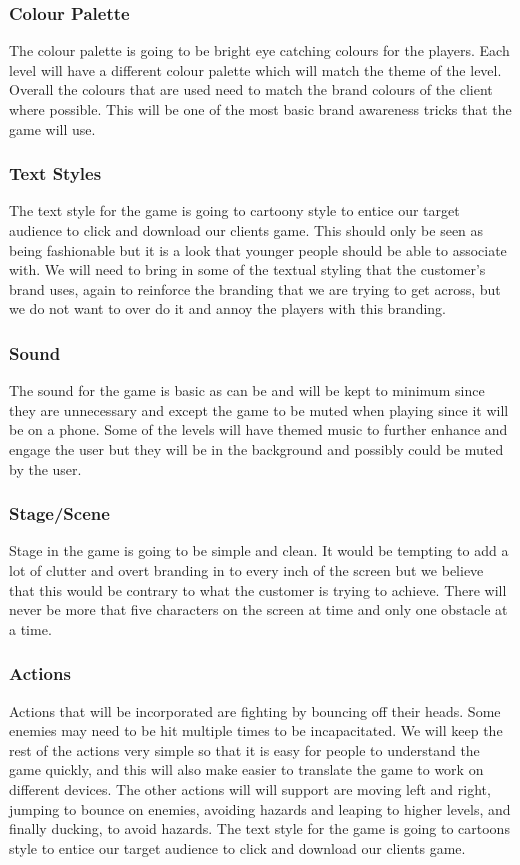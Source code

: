 \documentclass{article}
\begin{document}
\subsubsection{Colour Palette}
The colour palette is going to be bright eye catching colours for the players. Each level will have a different colour palette which will match the theme of the level.
Overall the colours that are used need to match the brand colours of the client where possible. This will be one of the most basic brand awareness tricks that the game will use.

\subsubsection{Text Styles}
The text style for the game is going to cartoony style to entice our target audience to click and download our clients game. This should only be seen as being fashionable but it is a look that younger people should be able to associate with. We will need to bring in some of the textual styling that the customer's brand uses, again to reinforce the branding that we are trying to get across, but we do not want to over do it and annoy the players with this branding.

\subsubsection{Sound}
The sound for the game is basic as can be and will be kept to minimum since they are unnecessary and except the game to be muted when playing since it will be on a phone. Some of the levels will have themed music to further enhance and engage the user but they will be in the background and possibly could be muted by the user.

\subsubsection{Stage/Scene}
Stage in the game is going to be simple and clean. It would be tempting to add a lot of clutter and overt branding in to every inch of the screen but we believe that this would be contrary to what the customer is trying to achieve. There will never be more that five characters on the screen at time and only one obstacle at a time.


\subsubsection{Actions}
Actions that will be incorporated are fighting by bouncing off their heads. Some enemies may need to be hit multiple times to be incapacitated. We will keep the rest of the actions very simple so that it is easy for people to understand the game quickly, and this will also make easier to translate the game to work on different devices. The other actions will will support are moving left and right, jumping to bounce on enemies, avoiding hazards and leaping to higher levels, and finally ducking, to avoid hazards.
The text style for the game is going to cartoons style to entice our target audience to click and download our clients game. 
\end{document}
